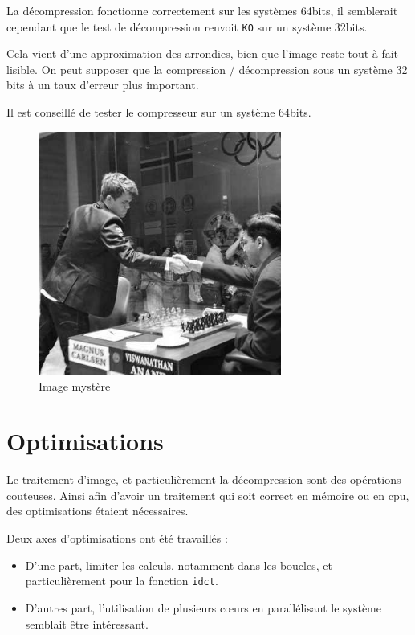 \documentclass[a4paper, 11pt]{article}
\begin{document}
\begin{attention}
	La décompression fonctionne correctement sur les systèmes 64bits, il semblerait cependant que le test de décompression renvoit \texttt{KO} sur un système
	32bits. 

	Cela vient d'une approximation des arrondies, bien que l'image reste tout à fait lisible. On peut supposer que la compression / décompression sous un système
	32 bits à un taux d'erreur plus important.

	Il est conseillé de tester le compresseur sur un système 64bits.
\end{attention}
	\begin{figure}[H]
		\centering
		\includegraphics[width=8cm]{mystery.jpg}
		\caption{Image mystère}
		\label{fig:mystere}
	\end{figure}

	\section{Optimisations}\label{opti}
	Le traitement d'image, et particulièrement la décompression sont des opérations couteuses. Ainsi afin d'avoir un traitement qui soit correct en mémoire
	ou en cpu, des optimisations étaient nécessaires. 

	Deux axes d'optimisations ont été travaillés : 
	\begin{itemize}
		\item D'une part, limiter les calculs, notamment dans les boucles, et particulièrement pour la fonction \texttt{idct}. 
		\item D'autres part, l'utilisation de plusieurs cœurs en parallélisant le système semblait être intéressant.
	\end{itemize}
	
\end{document}
